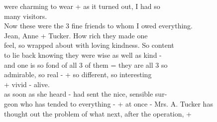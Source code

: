 \documentclass[11pt,a4paper]{article}
\begin{document}
{were charming to wear + as it turned out, I had so \\
many visitors. \\
\quad Now these were the 3 fine friends to whom I owed everything. \\
Jean, Anne +  Tucker. How rich they made one \\
feel, so wrapped about with loving kindness. So content \\
to lie back knowing they were wise as well as kind - \\
and one is so fond of all 3 of them = they are all 3 so \\
admirable, so real - + so different, so interesting \\
+ vivid - alive. \\
\quad {} as soon as she heard - had sent the nice, sensible sur- \\
geon who has tended to everything - + at once - Mrs. A. Tucker has \\
thought out the problem of what next, after the operation, +}




\end{document}
